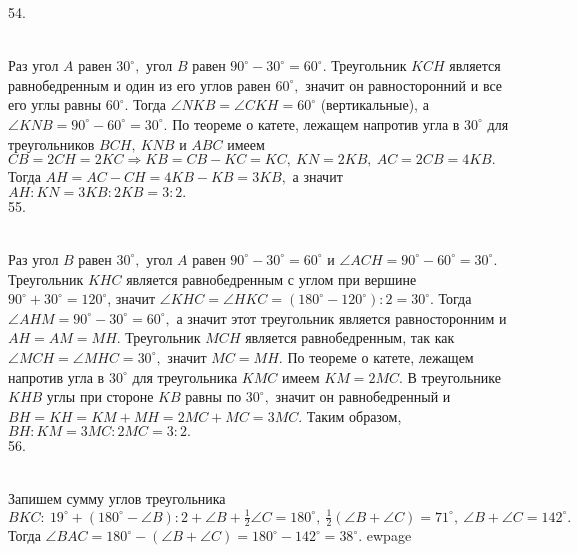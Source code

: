 54. \begin{figure}[ht!]
\end{figure}\\
Раз угол $A$ равен $30^\circ,$ угол $B$ равен $90^\circ-30^\circ=60^\circ.$ Треугольник $KCH$ является равнобедренным и один из его углов равен $60^\circ,$ значит он равносторонний и все его углы равны $60^\circ.$ Тогда $\angle NKB=\angle CKH=60^\circ$ (вертикальные), а $\angle KNB=90^\circ-60^\circ=30^\circ.$ По теореме о катете, лежащем напротив угла в $30^\circ$ для треугольников $BCH,\ KNB$ и $ABC$ имеем $CB=2CH=2KC\Rightarrow KB=CB-KC=KC,\ KN=2KB,\ AC=2CB=4KB.$ Тогда $AH=AC-CH=4KB-KB=3KB,$ а значит $AH:KN=3KB:2KB=3:2.$\\
55. \begin{figure}[ht!]
\end{figure}\\
Раз угол $B$ равен $30^\circ,$ угол $A$ равен $90^\circ-30^\circ=60^\circ$ и $\angle ACH=90^\circ-60^\circ=30^\circ.$  Треугольник $KHC$ является равнобедренным с углом при вершине $90^\circ+30^\circ=120^\circ$, значит $\angle KHC=\angle HKC=(180^\circ-120^\circ):2=30^\circ.$ Тогда $\angle AHM=90^\circ-30^\circ=60^\circ,$ а значит этот треугольник является равносторонним и $AH=AM=MH.$ Треугольник $MCH$ является равнобедренным, так как $\angle MCH=\angle MHC=30^\circ,$ значит $MC=MH.$  По теореме о катете, лежащем напротив угла в $30^\circ$ для треугольника $KMC$ имеем $KM=2MC.$ В треугольнике $KHB$ углы при стороне $KB$ равны по $30^\circ,$ значит он равнобедренный и  $BH=KH=KM+MH=2MC+MC=3MC.$ Таким образом, $BH:KM=3MC:2MC=3:2.$\\
56. \begin{figure}[ht!]
\end{figure}\\
Запишем сумму углов треугольника $BKC:\ 19^\circ+(180^\circ-\angle B):2+\angle B+\frac{1}{2}\angle C=180^\circ,\ \frac{1}{2}(\angle B+\angle C)=71^\circ,\ \angle B+\angle C=142^\circ.$ Тогда $\angle BAC=180^\circ-(\angle B+\angle C)=180^\circ-142^\circ=38^\circ.$
ewpage

